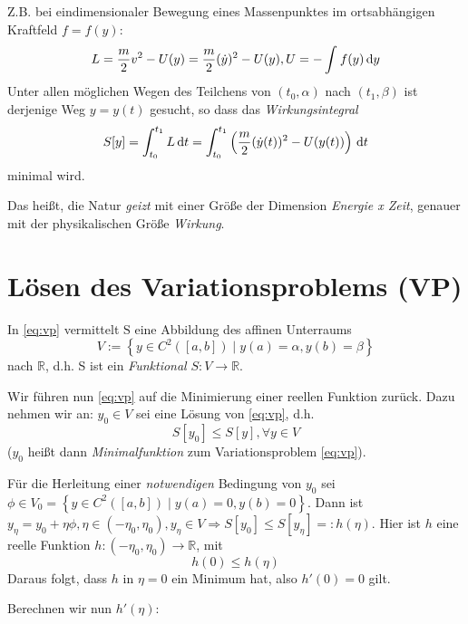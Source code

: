 Z.B. bei eindimensionaler Bewegung eines Massenpunktes im ortsabhängigen Kraftfeld $f=f(y)$:
\[ L = \frac{m}{2}v^2 - U(y) = \frac{m}{2}(\dot{y})^2 - U(y) , U = - \int_{}^{} f(y) \, \mathrm{d}y \]
Unter allen möglichen Wegen des Teilchens von $(t_{0}, \alpha)$ nach $(t_{1}, \beta)$ ist
derjenige Weg $y=y(t)$ gesucht, so dass das \textit{Wirkungsintegral}
\begin{equation}
    S[y] = \int_{t_{0}}^{t_{1}} L \, \mathrm{d}t = \int_{t_{0}}^{t_{1}} \left(\frac{m}{2}(\dot{y}(t))^{2} - U(y(t))\right) \, \mathrm{d}t
\end{equation}
minimal wird.

Das heißt, die Natur \textit{geizt} mit einer Größe der Dimension \textit{Energie x Zeit}, genauer mit der
physikalischen Größe \textit{Wirkung}.

\section{Lösen des Variationsproblems (VP)}

In \eqref{eq:vp} vermittelt $\mathrm{S}$ eine Abbildung des affinen Unterraums
\[ V := \left\{y\in C^2([a,b]) \mid y(a) = \alpha, y(b) = \beta \right\} \]
nach $\mathbb{R}$, d.h. S ist ein \textit{Funktional} $S: V\rightarrow\mathbb{R}$.

Wir führen nun \eqref{eq:vp} auf die Minimierung einer reellen Funktion zurück. Dazu nehmen wir an:
$y_0\in V$ sei eine Lösung von \eqref{eq:vp}, d.h.
\begin{equation}
    S[y_0] \leq S[y], \forall y\in V
\end{equation}
($y_0$ heißt dann \textit{Minimalfunktion} zum Variationsproblem \eqref{eq:vp}).


Für die Herleitung einer \textit{notwendigen} Bedingung von $y_0$ sei
$\phi\in V_0 = \left\{y\in C^2([a,b]) \mid y(a) = 0, y(b) = 0 \right\}$. Dann ist
$y_\eta = y_0 + \eta\phi, \eta\in(-\eta_0, \eta_0), y_\eta \in V \Rightarrow S[y_0] \leq S[y_\eta] =: h(\eta)$.
Hier ist $h$ eine reelle Funktion $h: (-\eta_0, \eta_0) \rightarrow \mathbb{R}$, mit
\begin{equation}
h(0) \leq h(\eta)
\end{equation}
Daraus folgt, dass $h$ in $\eta = 0$ ein Minimum hat, also $h'(0) = 0$ gilt.

Berechnen wir nun $h'(\eta)$:

